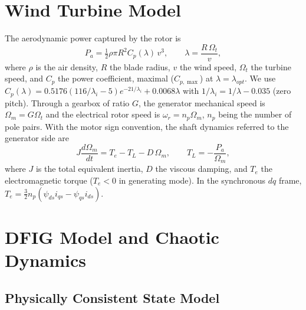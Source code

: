 \documentclass[conference]{IEEEtran}
\begin{document}
\section{Wind Turbine Model}

The aerodynamic power captured by the rotor is \cite{r37,r32,r33}
\begin{equation}
P_{a} = \tfrac{1}{2}\rho\pi R^{2}C_{p}(\lambda)\, v^{3},\qquad \lambda = \frac{R\,\Omega_{t}}{v},
\label{eq1}
\end{equation}
where $\rho$ is the air density, $R$ the blade radius, $v$ the wind speed, $\Omega_t$ the turbine speed, and $C_p$ the power coefficient, maximal ($C_{p,\max}$) at $\lambda=\lambda_{opt}$. We use $C_p(\lambda)=0.5176(116/\lambda_i-5)e^{-21/\lambda_i}+0.0068\lambda$ with $1/\lambda_i=1/\lambda-0.035$ (zero pitch). Through a gearbox of ratio $G$, the generator mechanical speed is $\Omega_m=G\Omega_t$ and the electrical rotor speed is $\omega_r=n_p\Omega_m$, $n_p$ being the number of pole pairs. With the motor sign convention, the shaft dynamics referred to the generator side are
\begin{equation}
J\frac{d\Omega_{m}}{dt} = T_{e} - T_{L} - D\,\Omega_{m},\qquad T_L=-\frac{P_a}{\Omega_m},
\label{eq2}
\end{equation}
where $J$ is the total equivalent inertia, $D$ the viscous damping, and $T_e$ the electromagnetic torque ($T_e<0$ in generating mode). In the synchronous $dq$ frame, $T_{e} = \tfrac{3}{2}n_{p}( \psi_{ds}i_{qs} - \psi_{qs}i_{ds})$.

\section{DFIG Model and Chaotic Dynamics}

\subsection{Physically Consistent State Model}
\end{document}
